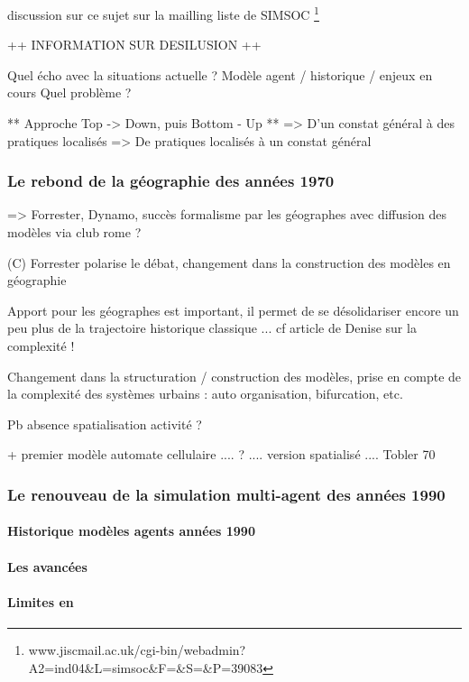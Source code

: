 {discussion sur ce sujet sur la mailling liste de SIMSOC \footnote {www.jiscmail.ac.uk/cgi-bin/webadmin?A2=ind04\&L=simsoc\&F=\&S=\&P=39083}

++ INFORMATION SUR DESILUSION ++

Quel écho avec la situations actuelle ?
Modèle agent / historique / enjeux en cours
Quel problème ?

** Approche Top -> Down, puis Bottom - Up **
=> D'un constat général à des pratiques localisés
=> De pratiques localisés à un constat général 

\subsubsection{Le rebond de la géographie des années 1970}
\label{ssubsec:rebond_geo}
=> Forrester, Dynamo, succès formalisme par les géographes avec diffusion des modèles via club rome ?

(C) Forrester polarise le débat, changement dans la construction des modèles en géographie

Apport pour les géographes est important, il permet de se désolidariser encore un peu plus de la trajectoire historique classique ...  cf article de Denise sur la complexité !

Changement dans la structuration / construction des modèles, prise en compte de la complexité des systèmes urbains : auto organisation, bifurcation, etc. 

Pb absence spatialisation activité ?

+ premier modèle automate cellulaire .... ? .... version spatialisé .... Tobler 70

\subsubsection{Le renouveau de la simulation multi-agent des années 1990 }

\paragraph{Historique modèles agents années 1990}

\paragraph{Les avancées }

\paragraph{Limites en}

}
